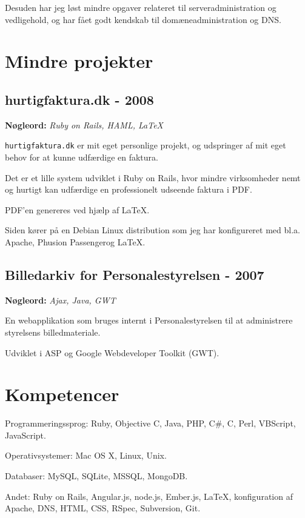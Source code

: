 \documentclass[a4paper]{article}
\newcommand{\keywords}[1]{\small\textbf{Nøgleord:} \emph{#1}\normalsize}
\renewenvironment{itemize}{
  \begin{list}{}
    { \setlength{\itemsep}{5pt}
      \setlength{\parsep}{0pt}
      \setlength{\topsep}{0pt}
      \setlength{\leftmargin}{0em} } }{
  \end{list}}
\begin{document}
Desuden har jeg løst mindre opgaver relateret til serveradministration og vedligehold, og har fået godt kendskab til domæneadministration og DNS.


\section*{Mindre projekter}

\subsection*{hurtigfaktura.dk - 2008}
\keywords{Ruby on Rails, HAML, \LaTeX}

\texttt{hurtigfaktura.dk} er mit eget personlige projekt, og udspringer af mit eget behov for at kunne udfærdige en faktura.

Det er et lille system udviklet i Ruby on Rails, hvor mindre virksomheder nemt og hurtigt kan udfærdige en professionelt udseende faktura i PDF.

PDF'en genereres ved hjælp af \LaTeX.

Siden kører på en Debian Linux distribution som jeg har konfigureret med bl.a. Apache, Phusion Passenger\texttrademark og \LaTeX.


\subsection*{Billedarkiv for Personalestyrelsen - 2007} 
\keywords{Ajax, Java, GWT}

En webapplikation som bruges internt i Personalestyrelsen til at administrere styrelsens billedmateriale.

Udviklet i ASP og Google Webdeveloper Toolkit (GWT).

\section*{Kompetencer}

\begin{itemize}
\item Programmeringssprog: Ruby, Objective C, Java, PHP, C\#, C, Perl, VBScript, JavaScript.
\item Operativsystemer: Mac OS X, Linux, Unix.
\item Databaser: MySQL, SQLite, MSSQL, MongoDB.
\item Andet: Ruby on Rails, Angular.js, node.js, Ember.js, \LaTeX, konfiguration af Apache, DNS, HTML, CSS, RSpec, Subversion, Git.
\end{itemize}
\end{document}

